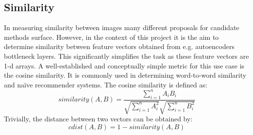 \subsection{Similarity}
In measuring similarity between images many different proposals for candidate methods surface. 
However, in the context of this project it is the aim to determine similarity between feature vectors obtained from e.g. autoencoders bottleneck layers.
This significantly simplifies the task as these feature vectors are 1-d arrays.
\newline
A well-established and conceptually simple metric for this use case is the cosine similarity. 
It is commonly used in determining word-to-word similarity and naïve recommender systems. 
The cosine similarity is defined as:
$$
similarity(A,B) = \frac{\sum\limits_{i=1}^n A_{i}B_{i}}{\sqrt{\sum\limits_{i=1}^n A_{i}^{2}} \sqrt{\sum\limits_{i=1}^n B_{i}^{2}}}
$$
Trivially, the distance between two vectors can be obtained by:
$$
cdist(A,B) = 1 - similarity(A,B)
$$



